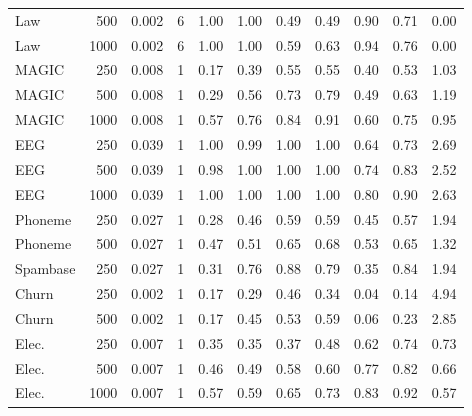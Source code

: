 \documentclass[pdflatex,sn-mathphys-num,iicol]{sn-jnl}
\theoremstyle{thmstyleone}
\theoremstyle{thmstyletwo}
\theoremstyle{thmstylethree}
\begin{document}
\begin{table}[t]
\begin{tabular}{lrrrrrrrrrr}
Law & 500 & 0.002 & 6 & 1.00 & 1.00 & 0.49 & 0.49 & 0.90 & 0.71 & 0.00 \\
Law & 1000 & 0.002 & 6 & 1.00 & 1.00 & 0.59 & 0.63 & 0.94 & 0.76 & 0.00 \\
MAGIC & 250 & 0.008 & 1 & 0.17 & 0.39 & 0.55 & 0.55 & 0.40 & 0.53 & 1.03 \\
MAGIC & 500 & 0.008 & 1 & 0.29 & 0.56 & 0.73 & 0.79 & 0.49 & 0.63 & 1.19 \\
MAGIC & 1000 & 0.008 & 1 & 0.57 & 0.76 & 0.84 & 0.91 & 0.60 & 0.75 & 0.95 \\
EEG & 250 & 0.039 & 1 & 1.00 & 0.99 & 1.00 & 1.00 & 0.64 & 0.73 & 2.69 \\
EEG & 500 & 0.039 & 1 & 0.98 & 1.00 & 1.00 & 1.00 & 0.74 & 0.83 & 2.52 \\
EEG & 1000 & 0.039 & 1 & 1.00 & 1.00 & 1.00 & 1.00 & 0.80 & 0.90 & 2.63 \\
Phoneme & 250 & 0.027 & 1 & 0.28 & 0.46 & 0.59 & 0.59 & 0.45 & 0.57 & 1.94 \\
Phoneme & 500 & 0.027 & 1 & 0.47 & 0.51 & 0.65 & 0.68 & 0.53 & 0.65 & 1.32 \\
Spambase & 250 & 0.027 & 1 & 0.31 & 0.76 & 0.88 & 0.79 & 0.35 & 0.84 & 1.94 \\
Churn & 250 & 0.002 & 1 & 0.17 & 0.29 & 0.46 & 0.34 & 0.04 & 0.14 & 4.94 \\
Churn & 500 & 0.002 & 1 & 0.17 & 0.45 & 0.53 & 0.59 & 0.06 & 0.23 & 2.85 \\
Elec. & 250 & 0.007 & 1 & 0.35 & 0.35 & 0.37 & 0.48 & 0.62 & 0.74 & 0.73 \\
Elec. & 500 & 0.007 & 1 & 0.46 & 0.49 & 0.58 & 0.60 & 0.77 & 0.82 & 0.66 \\
Elec. & 1000 & 0.007 & 1 & 0.57 & 0.59 & 0.65 & 0.73 & 0.83 & 0.92 & 0.57 \\
\bottomrule
\end{tabular}

\end{table}
\end{document}
